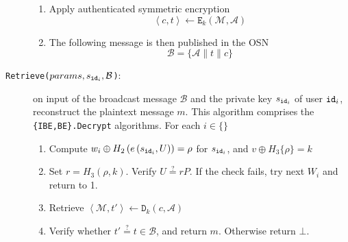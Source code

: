 \begin{algorithm}[H]
\begin{description}
\begin{enumerate}
        \item Apply authenticated symmetric encryption
        \begin{equation*}
            \left< c, t \right> \leftarrow \mathtt{E}_k(\mathcal{M},\mathcal{A})
        \end{equation*}
        \item The following message is then published in the OSN
        \begin{equation*}
            \mathcal{B} = \{ \mathcal{A} \parallel t \parallel c \}
        \end{equation*}
    \end{enumerate}
    \item[\texttt{Retrieve($params, s_{\mathtt{id}_{i}}, \mathcal{B}$)}:] on input of the broadcast message $\mathcal{B}$ and the private key $s_{\mathtt{id}_{i}}$ of user $\mathtt{id}_{i}$, reconstruct the plaintext message $m$. This algorithm comprises the \texttt{\{IBE,BE\}.Decrypt} algorithms. For each $i \in \{  \}$ \\

    \begin{enumerate}
        \item Compute $w_i \oplus H_2 \left( e \left( s_{\mathtt{id}_{i}}, U \right) \right) = \rho$ for $s_{\mathtt{id}_{i}}$, and $v \oplus H_3 \{ \rho \} = k$ 
        \item Set $r = H_3 \left( \rho, k \right)$. Verify $U \stackrel{?}{=} rP$. If the check fails, try next $W_i$ and return to 1.
        \item Retrieve $\left< \mathcal{M}, t' \right> \leftarrow \mathtt{D}_k(c, \mathcal{A})$
        \item Verify whether $t' \stackrel{?}{=} t \in \mathcal{B} $, and return $m$. Otherwise return $\bot$. 
    \end{enumerate}
\end{description}
\end{algorithm}
\newpage

\makeatletter
\setlength{\headsep}{19.8738pt}
\makeatother

